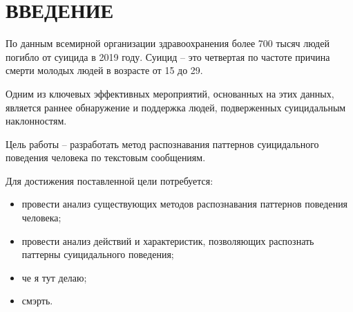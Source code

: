 \section*{ВВЕДЕНИЕ}

По данным всемирной организации здравоохранения более 700 тысяч людей погибло от суицида в 2019 году. Суицид -- это четвертая по частоте причина смерти молодых людей в возрасте от 15 до 29. \cite{suicideVOZ}

Одним из ключевых эффективных мероприятий, основанных на этих данных, является раннее обнаружение и поддержка людей, подверженных суицидальным наклонностям.

Цель работы -- разработать метод распознавания паттернов суицидального поведения человека по текстовым сообщениям.

Для достижения поставленной цели потребуется:
\begin{itemize}
	\item провести анализ существующих методов распознавания паттернов поведения человека;
	\item провести анализ действий и характеристик, позволяющих распознать паттерны суицидального поведения;
	\item че я тут делаю;
	\item смэрть.
\end{itemize}

\pagebreak